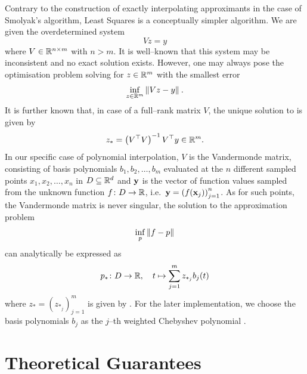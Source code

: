 \documentclass[12pt, oneside]{amsart}
\theoremstyle{definition}
\theoremstyle{remark}
\numberwithin{equation}{section}
\begin{document}
Contrary to the construction of exactly interpolating approximants in the case 
of Smolyak's algorithm, Least Squares is a conceptually simpler algorithm. We 
are given the overdetermined system \[
    Vz = y
\]
where \(V \in \R^{n \times m}\) with \(n > m\). It is well--known that this system may be inconsistent and no exact solution exists. However, one may always pose the optimisation problem solving for \(z \in \R^{m}\) with the smallest error
\begin{equation}\label{eq:leastSquares}
    \inf_{z \in \R^{m}} \norm[]{Vz - y}.
\end{equation}
It is further known that, in case of a full--rank matrix \(V\), the unique 
solution to  is given by 
\begin{equation}\label{eq:ls_solution_moore_penrose_inverse}
	z_* = \left(V^\top V\right)^{-1} V^\top y \in \R^m.
\end{equation}
In our specific case of polynomial interpolation, \(V\) is the Vandermonde 
matrix, consisting of basis polynomials \(b_1, b_2, \dots, b_m\) evaluated at 
the $n$ different sampled points \(x_1, x_2, \dots, x_n\) in \(D \subseteq 
\R^d\) and \(\bfy\) is the vector of function values sampled from the unknown 
function \(f\from D \to \R\), i.e.\ \(\bfy = \left(f(\bfx_j)\right)_{j=1}^n\). 
As for such points, the Vandermonde matrix is never singular, the solution to 
the approximation problem \[
    \inf_{p} \norm[]{f-p}
\]
can analytically be expressed as \[
    p_* \from D \to \R,\quad t \mapsto \sum_{j=1}^m z_{*_{j}} b_j(t)
\]
where \(z_* = \left(z_{*_j}\right)_{j=1}^m\) is given by 
.
For the later implementation, we choose the basis polynomials \(b_j\) as the \(j\)--th weighted Chebyshev polynomial .

\section{Theoretical Guarantees}
\end{document}
